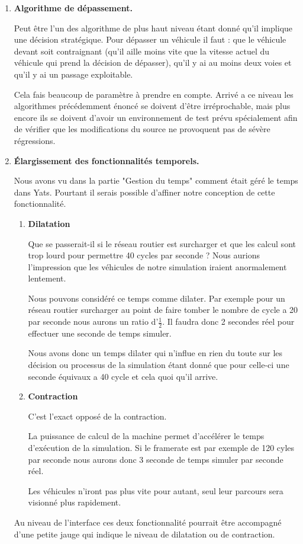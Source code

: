 \documentclass[a4paper,11pt]{article}
\begin{document}
\begin{enumerate}[label=-]
\item \textbf{Algorithme de dépassement.}

Peut être l'un des algorithme de plus haut niveau étant donné qu'il implique une décision stratégique. Pour dépasser un véhicule il faut : que le véhicule devant soit contraignant (qu'il aille moins vite que la vitesse actuel du véhicule qui prend la décision de dépasser), qu'il y ai au moins deux voies et qu'il y ai un passage exploitable.

Cela fais beaucoup de paramètre à prendre en compte. Arrivé a ce niveau les algorithmes précédemment énoncé se doivent d'être irréprochable, mais plus encore ils se doivent d'avoir un environnement de test prévu spécialement afin de vérifier que les modifications du source ne provoquent pas de sévère régressions.

\item \textbf{Élargissement des fonctionnalités temporels.}

Nous avons vu dans la partie "Gestion du temps" comment était géré le temps dans Yats. Pourtant il serais possible d'affiner notre conception de cette fonctionnalité.

\begin{enumerate}[label=*]

\item \textbf{Dilatation}

Que se passerait-il si le réseau routier est surcharger et que les calcul sont trop lourd pour permettre 40 cycles par seconde ? Nous aurions l'impression que les véhicules de notre simulation iraient anormalement lentement.

Nous pouvons considéré ce temps comme dilater. Par exemple pour un réseau routier surcharger au point de faire tomber le nombre de cycle a 20 par seconde nous aurons un ratio d'$\frac{1}{2}$. Il faudra donc 2 secondes réel pour effectuer une seconde de temps simuler. 

Nous avons donc un temps dilater qui n'influe en rien du toute sur les décision ou processus de la simulation étant donné que pour celle-ci une seconde équivaux a 40 cycle et cela quoi qu'il arrive.

\item \textbf{Contraction}

C'est l'exact opposé de la contraction.

La puissance de calcul de la machine permet d'accélérer le temps d'exécution de la simulation. Si le framerate est par exemple de 120 cyles par seconde nous aurons donc 3 seconde de temps simuler par seconde réel.

Les véhicules n'iront pas plus vite pour autant, seul leur parcours sera visionné plus rapidement.

\end{enumerate}%

Au niveau de l'interface ces deux fonctionnalité pourrait être accompagné d'une petite jauge qui indique le niveau de dilatation ou de contraction.

\end{enumerate} %
\end{document}
